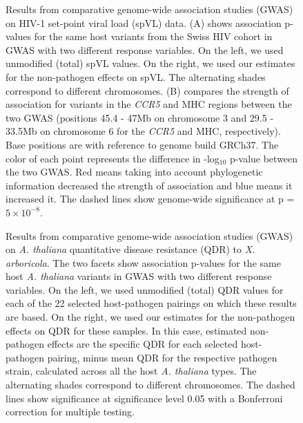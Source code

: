 \documentclass[11pt]{article}
\begin{document}
\begin{figure}[H]
	\begin{center}
		\caption{Results from comparative genome-wide association studies (GWAS) on HIV-1 set-point viral load (spVL) data. (A) shows association p-values for the same host variants from the Swiss HIV cohort in GWAS with two different response variables. On the left, we used unmodified (total) spVL values. On the right, we used our estimates for the non-pathogen effects on spVL. The alternating shades correspond to different chromosomes. (B) compares the strength of association for variants in the \emph{CCR5} and MHC regions between the two GWAS (positions 45.4 - 47Mb on chromosome 3 and 29.5 - 33.5Mb on chromosome 6 for the \emph{CCR5} and MHC, respectively). Base positions are with reference to genome build GRCh37. The color of each point represents the difference in -log$_{10}$ p-value between the two GWAS. Red means taking into account phylogenetic information decreased the strength of association and blue means it increased it. The dashed lines show genome-wide significance at p = $5 \times 10^{-8}$.}
		\label{fig:gwas-results}
	\end{center}
\end{figure}

\begin{figure}[H]
\begin{center}
	\caption{Results from comparative genome-wide association studies (GWAS) on \emph{A. thaliana} quantitative disease resistance (QDR) to \emph{X. arboricola}. The two facets show association p-values for the same host \emph{A. thaliana} variants in GWAS with two different response variables. On the left, we used unmodified (total) QDR values for each of the 22 selected host-pathogen pairings on which these results are based. On the right, we used our estimates for the non-pathogen effects on QDR for these samples. In this case, estimated non-pathogen effects are the specific QDR for each selected host-pathogen pairing, minus mean QDR for the respective pathogen strain, calculated across all the host \emph{A. thaliana} types. The alternating shades correspond to different chromosomes. The dashed lines show significance at significance level 0.05 with a Bonferroni correction for multiple testing.}
	\label{fig:gwas-results-qdr}
	\end{center}
\end{figure}
\end{document}
